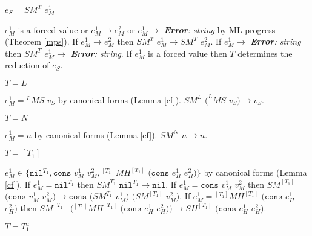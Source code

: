 \begin{case}

$e_{S}=SM^{T}$ $e_{M}^{1}$

$e_{M}^{1}$ is a forced value or $e_{M}^{1}\rightarrow e_{M}^{2}$ or $e_{M}^{1}\rightarrow$ \emph{\textbf{Error}: string} by ML progress (Theorem \ref{mps}).  If $e_{M}^{1}\rightarrow e_{M}^{2}$ then $SM^{T}$ $e_{M}^{1}\rightarrow SM^{T}$ $e_{M}^{2}$.  If $e_{M}^{1}\rightarrow$ \emph{\textbf{Error}: string} then $SM^{T}$ $e_{M}^{1}\rightarrow$ \emph{\textbf{Error}: string}.  If $e_{M}^{1}$ is a forced value then $T$ determines the reduction of $e_{S}$.

\begin{subcase}

$T=L$

$e_{M}^{1}={^{L}M}S$ $v_{S}$ by canonical forms (Lemma \ref{cf}).  $SM^{L}$ $(^{L}MS$ $v_{S})\rightarrow v_{S}$.

\end{subcase}

\begin{subcase}

$T=N$

$e_{M}^{1}=\overline{n}$ by canonical forms (Lemma \ref{cf}).  $SM^{N}$ $\overline{n}\rightarrow\overline{n}$.

\end{subcase}

\begin{subcase}

$T=[T_{1}]$

$e_{M}^{1}\in\lbrace\mathtt{nil}^{T_{1}},\mathtt{cons}$ $v_{M}^{1}$ $v_{M}^{2},{^{[T_{1}]}M}H^{[T_{1}]}$ $(\mathtt{cons}$ $e_{H}^{1}$ $e_{H}^{2})\rbrace$ by canonical forms (Lemma \ref{cf}).  If $e_{M}^{1}=\mathtt{nil}^{T_{1}}$ then $SM^{T_{1}}$ $\mathtt{nil}^{T_{1}}\rightarrow\mathtt{nil}$.  If $e_{M}^{1}=\mathtt{cons}$ $v_{M}^{1}$ $v_{M}^{2}$ then $SM^{[T_{1}]}$ $(\mathtt{cons}$ $v_{M}^{1}$ $v_{M}^{2})\rightarrow\mathtt{cons}$ $(SM^{T_{1}}$ $v_{M}^{1})$ $(SM^{[T_{1}]}$ $v_{M}^{2})$.  If $e_{M}^{1}={^{[T_{1}]}M}H^{[T_{1}]}$ $(\mathtt{cons}$ $e_{H}^{1}$ $e_{H}^{2})$ then $SM^{[T_{1}]}$ $({^{[T_{1}]}M}H^{[T_{1}]}$ $(\mathtt{cons}$ $e_{H}^{1}$ $e_{H}^{2}))\rightarrow SH^{[T_{1}]}$ $(\mathtt{cons}$ $e_{H}^{1}$ $e_{H}^{2})$.

\end{subcase}

\begin{subcase}

$T=T_{1}^{a}$


\end{subcase}
\end{case}
